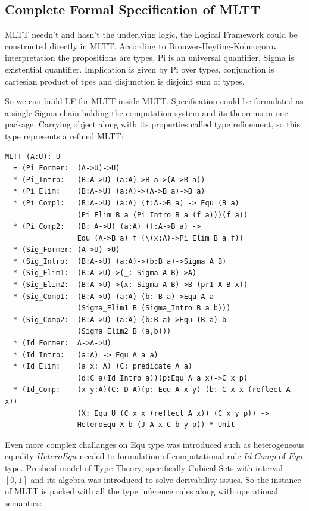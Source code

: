 \documentclass{svproc}
\begin{document}
\newpage
\subsection{Complete Formal Specification of MLTT}

MLTT needn't and hasn't the underlying logic, the Logical Framework could be constructed directly in MLTT.
According to Brouwer-Heyting-Kolmogorov interpretation the propositions are types,
Pi is an universal quantifier, Sigma is existential quantifier.
Implication is given by Pi over types, conjunction is cartesian
product of tpes and disjunction is disjoint sum of types.

So we can build LF for MLTT inside MLTT. Specification could be formulated as a
single Sigma chain holding the computation system and its theorems in one package.
Carrying object along with its properties called type refinement, so this type
represents a refined MLTT:

\begin{lstlisting}[mathescape=true]
MLTT (A:U): U
  = (Pi_Former:  (A->U)->U)
  * (Pi_Intro:   (B:A->U) (a:A)->B a->(A->B a))
  * (Pi_Elim:    (B:A->U) (a:A)->(A->B a)->B a)
  * (Pi_Comp1:   (B:A->U) (a:A) (f:A->B a) -> Equ (B a)
                 (Pi_Elim B a (Pi_Intro B a (f a)))(f a))
  * (Pi_Comp2:   (B: A->U) (a:A) (f:A->B a) ->
                 Equ (A->B a) f (\(x:A)->Pi_Elim B a f))
  * (Sig_Former: (A->U)->U)
  * (Sig_Intro:  (B:A->U) (a:A)->(b:B a)->Sigma A B)
  * (Sig_Elim1:  (B:A->U)->(_: Sigma A B)->A)
  * (Sig_Elim2:  (B:A->U)->(x: Sigma A B)->B (pr1 A B x))
  * (Sig_Comp1:  (B:A->U) (a:A) (b: B a)->Equ A a
                 (Sigma_Elim1 B (Sigma_Intro B a b)))
  * (Sig_Comp2:  (B:A->U) (a:A) (b:B a)->Equ (B a) b
                 (Sigma_Elim2 B (a,b)))
  * (Id_Former:  A->A->U)
  * (Id_Intro:   (a:A) -> Equ A a a)
  * (Id_Elim:    (a x: A) (C: predicate A a)
                 (d:C a(Id_Intro a))(p:Equ A a x)->C x p)
  * (Id_Comp:    (x y:A)(C: D A)(p: Equ A x y) (b: C x x (reflect A x))
                 (X: Equ U (C x x (reflect A x)) (C x y p)) ->
                 HeteroEqu X b (J A x C b y p)) * Unit
\end{lstlisting}

Even more complex challanges on Equ type was introduced such
as heterogeneous equality $HeteroEqu$ needed to formulation
of computational rule $Id\_Comp$ of $Equ$ type. Presheaf model of Type Theory, specifically
Cubical Sets with interval $[0,1]$ and
its algebra was introduced to solve derivability issues. So the instance of MLTT is packed
with all the type inference rules along with operational semantics:
\end{document}
